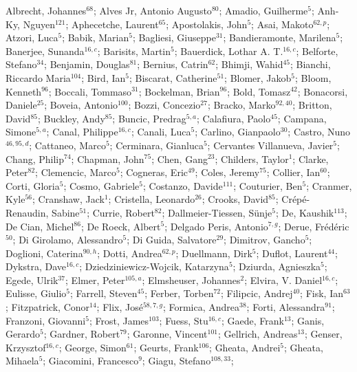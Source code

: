 Albrecht, Johannes$^{68}$;
Alves Jr, Antonio Augusto$^{80}$;
Amadio, Guilherme$^{5}$;
Anh-Ky, Nguyen$^{121}$;
Aphecetche, Laurent$^{65}$;
Apostolakis, John$^{5}$;
Asai, Makoto$^{62,p}$;
Atzori, Luca$^{5}$;
Babik, Marian$^{5}$;
Bagliesi, Giuseppe$^{31}$;
Bandieramonte, Marilena$^{5}$;
Banerjee, Sunanda$^{16,c}$;
Barisits, Martin$^{5}$;
Bauerdick, Lothar A. T.$^{16,c}$;
Belforte, Stefano$^{34}$;
Benjamin, Douglas$^{81}$;
Bernius, Catrin$^{62}$;
Bhimji, Wahid$^{45}$;
Bianchi, Riccardo Maria$^{104}$;
Bird, Ian$^{5}$;
Biscarat, Catherine$^{51}$;
Blomer, Jakob$^{5}$;
Bloom, Kenneth$^{96}$;
Boccali, Tommaso$^{31}$;
Bockelman, Brian$^{96}$;
Bold, Tomasz$^{42}$;
Bonacorsi, Daniele$^{25}$;
Boveia, Antonio$^{100}$;
Bozzi, Concezio$^{27}$;
Bracko, Marko$^{92,40}$;
Britton, David$^{85}$;
Buckley, Andy$^{85}$;
Buncic, Predrag$^{5,a}$;
Calafiura, Paolo$^{45}$;
Campana, Simone$^{5,a}$;
Canal, Philippe$^{16,c}$;
Canali, Luca$^{5}$;
Carlino, Gianpaolo$^{30}$;
Castro, Nuno$^{46,95,d}$;
Cattaneo, Marco$^{5}$;
Cerminara, Gianluca$^{5}$;
Cervantes Villanueva, Javier$^{5}$;
Chang, Philip$^{74}$;
Chapman, John$^{75}$;
Chen, Gang$^{23}$;
Childers, Taylor$^{1}$;
Clarke, Peter$^{82}$;
Clemencic, Marco$^{5}$;
Cogneras, Eric$^{49}$;
Coles, Jeremy$^{75}$;
Collier, Ian$^{60}$;
Corti, Gloria$^{5}$;
Cosmo, Gabriele$^{5}$;
Costanzo, Davide$^{111}$;
Couturier, Ben$^{5}$;
Cranmer, Kyle$^{56}$;
Cranshaw, Jack$^{1}$;
Cristella, Leonardo$^{26}$;
Crooks, David$^{85}$;
Crépé-Renaudin, Sabine$^{51}$;
Currie, Robert$^{82}$;
Dallmeier-Tiessen, Sünje$^{5}$;
De, Kaushik$^{113}$;
De Cian, Michel$^{86}$;
De Roeck, Albert$^{5}$;
Delgado Peris, Antonio$^{7,g}$;
Derue, Frédéric$^{50}$;
Di Girolamo, Alessandro$^{5}$;
Di Guida, Salvatore$^{29}$;
Dimitrov, Gancho$^{5}$;
Doglioni, Caterina$^{90,h}$;
Dotti, Andrea$^{62,p}$;
Duellmann, Dirk$^{5}$;
Duflot, Laurent$^{44}$;
Dykstra, Dave$^{16,c}$;
Dziedziniewicz-Wojcik, Katarzyna$^{5}$;
Dziurda, Agnieszka$^{5}$;
Egede, Ulrik$^{37}$;
Elmer, Peter$^{105,a}$;
Elmsheuser, Johannes$^{2}$;
Elvira, V. Daniel$^{16,c}$;
Eulisse, Giulio$^{5}$;
Farrell, Steven$^{45}$;
Ferber, Torben$^{72}$;
Filipcic, Andrej$^{40}$;
Fisk, Ian$^{63}$;
Fitzpatrick, Conor$^{14}$;
Flix, José$^{58,7,g}$;
Formica, Andrea$^{38}$;
Forti, Alessandra$^{91}$;
Franzoni, Giovanni$^{5}$;
Frost, James$^{103}$;
Fuess, Stu$^{16,c}$;
Gaede, Frank$^{13}$;
Ganis, Gerardo$^{5}$;
Gardner, Robert$^{79}$;
Garonne, Vincent$^{101}$;
Gellrich, Andreas$^{13}$;
Genser, Krzysztof$^{16,c}$;
George, Simon$^{61}$;
Geurts, Frank$^{106}$;
Gheata, Andrei$^{5}$;
Gheata, Mihaela$^{5}$;
Giacomini, Francesco$^{9}$;
Giagu, Stefano$^{108,33}$;
